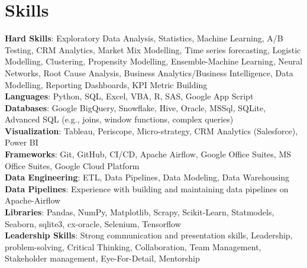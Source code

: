 \section{Skills}
  \begin{itemize}[leftmargin=0.1in, label={}]
    \normalsize{\item{
      \textbf{Hard Skills}: Exploratory Data Analysis, Statistics, Machine Learning, A/B Testing, CRM Analytics, Market Mix Modelling, Time series forecasting, Logistic Modelling, Clustering, Propensity Modelling, Ensemble-Machine Learning, Neural Networks, Root Cause Analysis, Business Analytics/Business Intelligence, Data Modelling, Reporting Dashboards, KPI Metric Building \\
      \textbf{Languages}: Python, SQL, Excel, VBA, R, SAS, Google App Script\\
      \textbf{Databases}: Google BigQuery, Snowflake, Hive, Oracle, MSSql, SQLite, Advanced SQL (e.g., joins, window functions, complex queries) \\
      \textbf{Visualization}: Tableau, Periscope, Micro-strategy, CRM Analytics (Salesforce), Power BI \\
      \textbf{Frameworks}: Git, GitHub, CI/CD, Apache Airflow, Google Office Suites, MS Office Suites, Google Cloud Platform \\
      \textbf{Data Engineering}: ETL, Data Pipelines, Data Modeling, Data Warehousing \\
      \textbf{Data Pipelines}: Experience with building and maintaining data pipelines on Apache-Airflow \\
      \textbf{Libraries}: Pandas, NumPy, Matplotlib, Scrapy, Scikit-Learn, Statmodels, Seaborn, sqlite3, cx-oracle, Selenium, Tensorflow \\
      \textbf{Leadership Skills}: Strong communication and presentation skills, Leadership, problem-solving, Critical Thinking, Collaboration, Team Management, Stakeholder management, Eye-For-Detail, Mentorship \\
     }}
  \end{itemize}
\vspace{-18pt}
